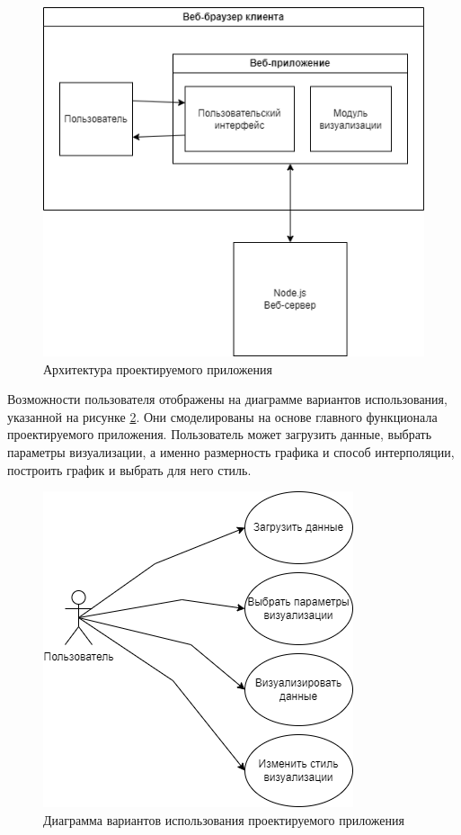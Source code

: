 \begin{figure}[h!]
    \center
    \includegraphics[scale=1]{fig/architechture.png}
    \caption{Архитектура проектируемого приложения}
    \label{fig:5}
\end{figure}

Возможности пользователя отображены на диаграмме вариантов использования, указанной на рисунке \ref{fig:6}. Они смоделированы на основе главного функционала проектируемого приложения. Пользователь может загрузить данные, выбрать параметры визуализации, а именно размерность графика и способ интерполяции, построить график и выбрать для него стиль.

\begin{figure}[h!]
    \center
    \includegraphics[scale=1]{fig/variant_use.png}
    \caption{Диаграмма вариантов использования проектируемого приложения}
    \label{fig:6}
\end{figure}

